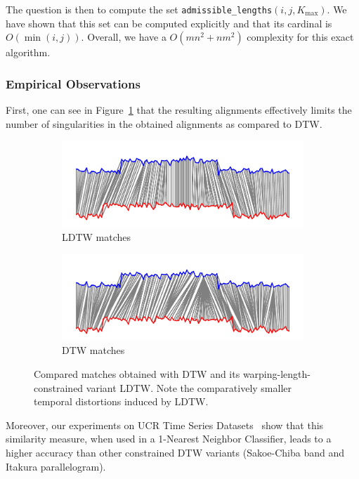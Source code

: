 The question is then to compute the set
\texttt{admissible\_lengths}$(i, j, K_\text{max})$.
We have shown that this set can be computed explicitly and that its cardinal
is $O(\min(i, j))$.
Overall, we have a $O(mn^2 + nm^2)$ complexity for this exact algorithm.

\subsubsection{Empirical Observations}

First, one can see in Figure~\ref{fig:ldtw} that the resulting alignments
effectively limits the number of singularities in the obtained alignments as
compared to DTW.

\begin{figure}[t]
    \begin{subfigure}[b]{\textwidth}
         \centering
         \includegraphics[width=.8\textwidth]{fig/dtw_warping_length}
         \caption{LDTW matches}
     \end{subfigure}
     \begin{subfigure}[b]{\textwidth}
          \centering
          \includegraphics[width=.8\textwidth]{fig/dtw_warping_length_b}
          \caption{DTW matches}
      \end{subfigure}
    \caption{Compared matches obtained with DTW and its
    warping-length-constrained variant LDTW. Note the comparatively smaller
    temporal distortions induced by LDTW.}
    \label{fig:ldtw}
\end{figure}

Moreover, our experiments on UCR Time Series Datasets~\cite{ucr} show that
this similarity measure, when used in a 1-Nearest Neighbor Classifier, leads to
a higher accuracy than other constrained DTW variants
(Sakoe-Chiba band and Itakura parallelogram).
